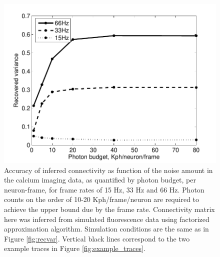 \begin{figure}[h]
\centering
\begin{minipage}[c]{0.6\hsize}
\includegraphics[width=\hsize]{../figs/FigureA6_recvar_SNR}
\end{minipage}
\caption{Accuracy of inferred connectivity as function of the noise amount in the calcium imaging data, as quantified by photon budget, per neuron-frame, for frame rates of 15 Hz, 33 Hz and 66 Hz. Photon counts on the order of 10-20 Kph/frame/neuron are required to achieve the upper bound due by the frame rate. Connectivity matrix here was inferred from simulated fluorescence data using factorized approximation algorithm. Simulation conditions are the same as in Figure \ref{fig:recvar}.  Vertical black lines correspond to the two example traces in Figure \ref{fig:example_traces}.}
\label{fig:recvar-SNR}
\end{figure}

